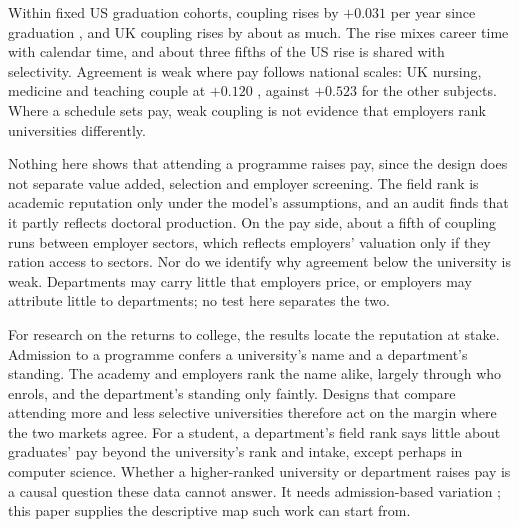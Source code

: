 Within fixed US graduation cohorts, coupling rises by $+0.031$ per year since graduation , and UK
coupling rises by about as much. The rise mixes career time with calendar time, and about three fifths of the US
rise is shared with selectivity. Agreement is weak where pay follows national scales: UK nursing, medicine and
teaching couple at $+0.120$ , against $+0.523$ for the other subjects. Where a schedule sets pay,
weak coupling is not evidence that employers rank universities differently.

Nothing here shows that attending a programme raises pay, since the design does not separate value added, selection
and employer screening. The field rank is academic reputation only under the model's assumptions, and an audit finds
that it partly reflects doctoral production. On the pay side, about a fifth of coupling runs between employer
sectors, which reflects employers' valuation only if they ration access to sectors. Nor do we identify why agreement
below the university is weak. Departments may carry little that employers price, or employers may attribute little
to departments; no test here separates the two.

For research on the returns to college, the results locate the reputation at stake. Admission to a programme confers
a university's name and a department's standing. The academy and employers rank the name alike, largely through who
enrols, and the department's standing only faintly. Designs that compare attending more and less selective
universities \citep{dale2002estimating, anelli2020returns} therefore act on the margin where the two markets agree.
For a student, a department's field rank says little about graduates' pay beyond the university's rank and intake,
except perhaps in computer science. Whether a higher-ranked university or department raises pay is a causal question
these data cannot answer. It needs admission-based variation \citep{hoekstra2009effect, kirkeboen2016field,
anelli2020returns}; this paper supplies the descriptive map such work can start from.

